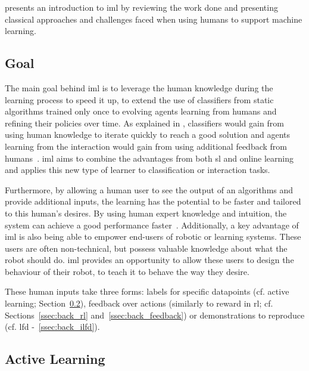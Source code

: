 \cite{amershi2014power} presents an introduction to \gls{iml} by reviewing the work done and presenting classical approaches and challenges faced when using humans to support machine learning.

\subsection{Goal}

The main goal behind \gls{iml} is to leverage the human knowledge during the learning process to speed it up, to extend the use of classifiers from static algorithms trained only once to evolving agents learning from humans and refining their policies over time. As explained in \cite{fails2003interactive}, classifiers would gain from using human knowledge to iterate quickly to reach a good solution and agents learning from the interaction would gain from using additional feedback from humans~\citep{thomaz2008teachable,knox2009interactively}. \gls{iml} aims to combine the advantages from both \gls{sl} and online learning and applies this new type of learner to classification or interaction tasks.

Furthermore, by allowing a human user to see the output of an algorithms and provide additional inputs, the learning has the potential to be faster and tailored to this human's desires. By using human expert knowledge and intuition, the system can achieve a good performance faster~\citep{thomaz2008teachable}. Additionally, a key advantage of \gls{iml} is also being able to empower end-users of robotic or learning systems. These users are often non-technical, but possess valuable knowledge about what the robot should do. \gls{iml} provides an opportunity to allow these users to design the behaviour of their robot, to teach it to behave the way they desire.

These human inputs take three forms: labels for specific datapoints (cf. active learning; Section~\ref{ssec:back_active}), feedback over actions (similarly to reward in \gls{rl}; cf. Sections~\ref{ssec:back_rl} and~\ref{ssec:back_feedback}) or demonstrations to reproduce (cf. \gls{lfd} -~\ref{ssec:back_ilfd}).

\subsection{Active Learning} \label{ssec:back_active}

